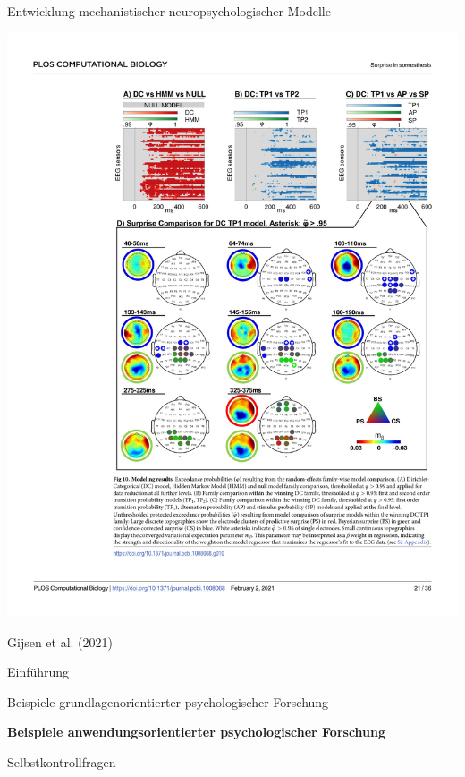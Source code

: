 \documentclass[
  8pt,
  ignorenonframetext,
]{beamer}
\begin{document}
\begin{frame}{Entwicklung mechanistischer neuropsychologischer Modelle}
\begin{center}\includegraphics[width=0.9\linewidth]{2_Abbildungen/pfm_2_gijsen_datenanalyse_2} \end{center}
\flushright
\footnotesize

Gijsen et al. (2021)
\end{frame}

\begin{frame}{}
\protect\hypertarget{section-5}{}
\large

Einführung

Beispiele grundlagenorientierter psychologischer Forschung

\textbf{Beispiele anwendungsorientierter psychologischer Forschung}

Selbstkontrollfragen
\end{frame}
\end{document}
